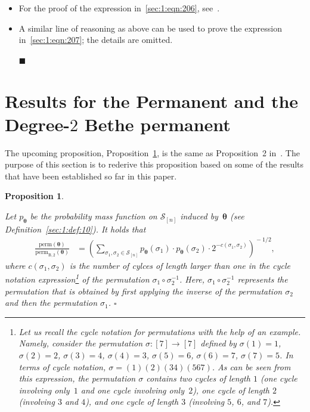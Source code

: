 \documentclass[journal,lettersize,twocolumn]{IEEEtran} %
\renewcommand\qedsymbol{$\blacksquare$}
\newtheorem{proposition}[theorem]{Proposition}
\newcommand{\eproposition}{\hfill$\square$}
\newcommand{\epropositionproof}{\hfill\qedsymbol}
\newcommand{\set}[1]{\mathcal{#1}}
\newcommand{\matr}[1]{ \bm{#1} }
\newcommand{\perm}{ \mathrm{perm} }
\newcommand{\permbM}[1]{\perm_{ \mathrm{B}, #1 }}
\newcommand{\pmtheta}{p_{\mtheta}}
\newcommand{\setS}{\set{S}}
\newcommand{\mtheta}{\matr{\theta}}
\begin{document}
\begin{itemize}
\item For the proof of the expression in~\eqref{sec:1:eqn:206},
  see~\cite[Section~VII]{Vontobel2013}.

\item A similar line of reasoning as above can be used to prove the expression
  in~\eqref{sec:1:eqn:207}; the details are omitted.

  \epropositionproof

\end{itemize}

%
%

\ifx\withclearpagecommands\x
\clearpage
\fi

\section{Results for the Permanent and the \\ 
               \texorpdfstring{Degree-$2$ Bethe permanent}{}}
\label{apx:22}

%

The upcoming proposition, Proposition~\ref{prop:ratio:perm:permbM:2:1}, is the
same as Proposition~2 in~\cite{KitShing2022}. The purpose of this section is
to rederive this proposition based on some of the results that have been
established so far in this paper.

%

\begin{proposition}
  \label{prop:ratio:perm:permbM:2:1}
  
  Let $\pmtheta$ be the probability mass function on $\setS_{[n]}$ induced
  by~$\mtheta$ (see Definition~\ref{sec:1:def:10}). It holds that
  \begin{align}
    \frac{ \perm(\mtheta) }{ \permbM{2}(\mtheta) }
      &= \left(
            \sum\limits_{ \sigma_1,\sigma_{2} \in \setS_{[n]} } 
              \pmtheta( \sigma_1 )
              \cdot
              \pmtheta( \sigma_{2} ) 
              \cdot
              2^{-c(\sigma_1,\sigma_2)}
         \right)^{\!\!\! -1/2},
           \label{eq:ratio:perm:permbM:2:result:1}
  \end{align}
  where $c(\sigma_1,\sigma_2)$ is the number of cylces of length larger than
  one in the cycle notation
  expression\footnote{\label{footnote:cycle:notation:example:1}%
    Let us recall the cycle notation for permutations with the help of an
    example. Namely, consider the permutation $\sigma: [7] \to [7]$ defined by
    $\sigma(1) = 1$, $\sigma(2) = 2$, $\sigma(3) = 4$, $\sigma(4) = 3$,
    $\sigma(5) = 6$, $\sigma(6) = 7$, $\sigma(7) = 5$. In terms of cycle
    notation, $\sigma = (1)(2)(34)(567)$. As can be seen from this expression,
    the permutation $\sigma$ contains two cycles of length $1$ (one cycle
    involving only~$1$ and one cycle involving only~$2$), one cycle of length
    $2$ (involving $3$ and $4$), and one cycle of length $3$ (involving $5$,
    $6$, and $7$).} of the permutation ${\sigma_1 \circ \sigma_2^{-1}}$. Here,
  $\sigma_1 \circ \sigma_2^{-1}$ represents the permutation that is obtained
  by first applying the inverse of the permutation $\sigma_2$ and then the
  permutation $\sigma_1$.
  \eproposition
 \end{proposition}
\end{document}
